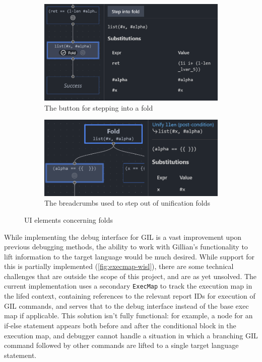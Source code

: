 \begin{figure}
  \centering
  \begin{subfigure}[b]{0.45\textwidth}
    \centering
    \includegraphics[width=\textwidth]{img/unifymap-fold-button.png}
    \caption{The button for stepping into a fold}%
    \label{fig:unifymap-fold-button}
  \end{subfigure}
  \quad
  \begin{subfigure}[b]{0.45\textwidth}
    \centering
    \includegraphics[width=\textwidth]{img/unifymap-breadcrumbs.png}
    \caption{The breadcrumbs used to step out of unification folds}%
    \label{fig:unifymap-breadcrumbs}
  \end{subfigure}
  \caption{UI elements concerning folds}
\end{figure}

While implementing the debug interface for GIL is a vast improvement upon
previous debugging methods, the ability to work with Gillian's functionality
to lift information to the target language would be much desired. While support
for this is partially implemented (\autoref{fig:execmap-wisl}), there are some
technical challenges that are outside the scope of this project, and are as yet
unsolved. The current implementation uses a secondary \texttt{ExecMap} to track
the execution map in the lifed context, containing references to the relevant
report IDs for execution of GIL commands, and serves that to the debug interface
instead of the base exec map if applicable. This solution isn't fully
functional: for example, a node for an if-else statement appears both before
and after the conditional block in the execution map, and debugger cannot
handle a situation in which a branching GIL command followed by other commands
are lifted to a single target language statement.

